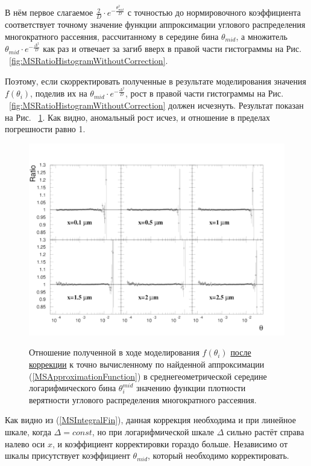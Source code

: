 \documentclass[a4paper,12pt]{article}
\begin{document}
\begin{large}
	В нём первое слагаемое $\frac{2}{D} \cdot e^{-\frac{\theta^2_{mid}}{D}}$ с точностью до нормировочного коэффициента соответствует точному значение функции аппроксимации углового распределения многократного рассеяния, рассчитанному в середине бина $\theta_{mid}$, а множитель $\theta_{mid} \cdot e^{-\frac{\Delta^2}{D}}$ как раз и отвечает за загиб вверх в правой части гистограммы на Рис. ~\ref{fig:MSRatioHistogramWithoutCorrection}.
	
	Поэтому, если скорректировать полученные в результате моделирования значения $f(\theta_i)$, поделив их на $\theta_{mid} \cdot e^{-\frac{\Delta^2}{D}}$, рост в правой части гистограммы на Рис. ~\ref{fig:MSRatioHistogramWithoutCorrection} должен исчезнуть.
	Результат показан на Рис. ~\ref{fig:MSRatioHistogramWithCorrection}.
	Как видно, аномальный рост исчез, и отношение в пределах погрешности равно 1.
	
\begin{figure}[ht]
{
   \includegraphics[width=0.99\linewidth]{images/ratioms_with_correction.pdf}
}
\caption{Отношение полученной в ходе моделирования $f(\theta_i)$ \underline{после коррекции} к точно вычисленному по найденной аппроксимации (\ref{MSApproximationFunction}) в среднегеометрической середине логарифмического бина $\theta^{mid}_i$ значению функции плотности верятности углового распределения многократного рассеяния.}
\label{fig:MSRatioHistogramWithCorrection}
\end{figure}

	Как видно из (\ref{MSIntegralFin}), данная коррекция необходима и при линейное шкале, когда $\Delta=const$, но при логарифмической шкале $\Delta$ сильно растёт справа налево оси $x$, и коэффициент корректировки гораздо больше.
	Независимо от шкалы присутствует коэффициент $\theta_{mid}$, который необходимо корректировать.


\end{large}
\end{document}
